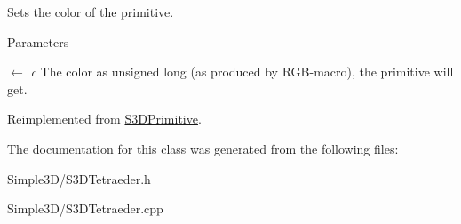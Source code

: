 Sets the color of the primitive. 


\begin{DoxyParams}{Parameters}
\item[\mbox{$\leftarrow$} {\em c}]The color as unsigned long (as produced by RGB-\/macro), the primitive will get. \end{DoxyParams}


Reimplemented from \hyperlink{class_s3_d_primitive_a1c8f036193987522bdfb6a49b9b74000}{S3DPrimitive}.



The documentation for this class was generated from the following files:\begin{DoxyCompactItemize}
\item 
Simple3D/S3DTetraeder.h\item 
Simple3D/S3DTetraeder.cpp\end{DoxyCompactItemize}
